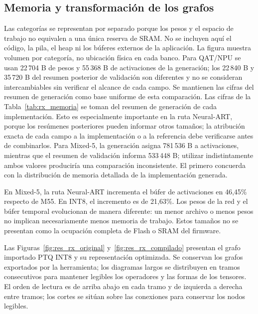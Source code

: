 \subsection{Memoria y transformación de los grafos}

Las categorías se representan por separado porque los pesos y el espacio de trabajo no equivalen a una única reserva de SRAM. No se incluyen aquí el código, la pila, el heap ni los búferes externos de la aplicación. La figura muestra volumen por categoría, no ubicación física en cada banco. Para QAT/NPU se usan 22\,704 B de pesos y 55\,368 B de activaciones de la generación; los 22\,840 B y 35\,720 B del resumen posterior de validación son diferentes y no se consideran intercambiables sin verificar el alcance de cada campo. Se mantienen las cifras del resumen de generación como base uniforme de esta comparación.
Las cifras de la Tabla~\ref{tab:rx_memoria} se toman del resumen de generación de cada implementación. Esto es especialmente importante en la ruta Neural-ART, porque los resúmenes posteriores pueden informar otros tamaños; la atribución exacta de cada campo a la implementación o a la referencia debe verificarse antes de combinarlos. Para Mixed-5, la generación asigna 781\,536 B a activaciones, mientras que el resumen de validación informa 533\,448 B; utilizar indistintamente ambos valores produciría una comparación inconsistente. El primero concuerda con la distribución de memoria detallada de la implementación generada.

En Mixed-5, la ruta Neural-ART incrementa el búfer de activaciones en 46,45\% respecto de M55. En INT8, el incremento es de 21,63\%. Los pesos de la red y el búfer temporal evolucionan de manera diferente: un menor archivo o menos pesos no implican necesariamente menos memoria de trabajo. Estos tamaños no se presentan como la ocupación completa de Flash o SRAM del firmware.

Las Figuras~\ref{fig:res_rx_original} y~\ref{fig:res_rx_compilado} presentan el grafo importado PTQ INT8 y su representación optimizada. Se conservan los grafos exportados por la herramienta; los diagramas largos se distribuyen en tramos consecutivos para mantener legibles los operadores y las formas de los tensores. El orden de lectura es de arriba abajo en cada tramo y de izquierda a derecha entre tramos; los cortes se sitúan sobre las conexiones para conservar los nodos legibles.

